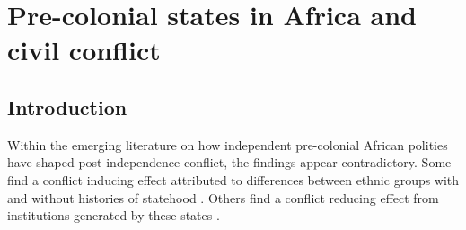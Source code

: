 
\chapter{Pre-colonial states in Africa and civil conflict}


\begin{abstract}

[Alternative titles: "Distance does not make the heart grow fonder: Subtitle"
"The Legacy: Subtitle"]

This paper examines the relationship between the presence of pre-colonial states
and post cold war civil conflict. I argue that pre-colonial state presence can
be conflict inducing or reducing depending on the relationship between the
pre-colonial and post-independence states. To test this argument the paper
introduces the Geo-ISD data set, which maps the borders of 82 independent states
in Africa in the 1800-1914 period. I use these data to create a topographic
measure of state presence. Proxying the relationship between the pre-colonial
and post-independence state using the distance from the post-independence
capital, the article finds that higher levels of pre-colonial state presence are
conflict reducing in areas surrounding modern capital cities, which is
consistent with greater continuity of traditions and institutions associated
with statehood that are inherently conflict reducing. In areas further away from
the post-independence capital, higher levels of pre-colonial statehood are found
to be conflict inducing, consistent with the view that state legacies can
represent powerful symbols of past independence useful for mobilization, and
leave behind regional elite networks with the potential to violently resist
centralisation efforts of national governments. 

\end{abstract}

\bigskip
	

\pagebreak




\section{Introduction} \label{Introduction}

Within the emerging literature on how independent pre-colonial African polities
have shaped post independence conflict, the findings appear contradictory. Some
find a conflict inducing effect attributed to differences between ethnic groups with
and without histories of statehood \citep{Englebert2002, Paine2019}. Others find
a conflict reducing effect from institutions generated by these states
\citep{Depetris-Chauvin2016, Wig2016}.

